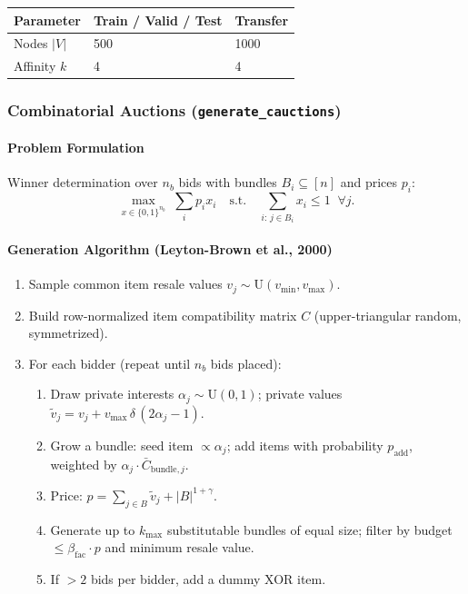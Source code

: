 \begin{tabular}{lll}
\toprule
Parameter & Train / Valid / Test & Transfer \\
\midrule
Nodes $|V|$  & 500 & 1000 \\
Affinity $k$ & 4   & 4    \\
\bottomrule
\end{tabular}

\subsubsection{Combinatorial Auctions (\texttt{generate\_cauctions})}

\paragraph{Problem Formulation}

Winner determination over $n_b$ bids with bundles $B_i \subseteq [n]$ and prices $p_i$:
\begin{equation}
    \max_{x \in \{0,1\}^{n_b}}\;\sum_i p_i x_i \quad\text{s.t.}\quad \sum_{i:\,j\in B_i} x_i \leq 1\;\;\forall j.
\end{equation}

\paragraph{Generation Algorithm (Leyton-Brown et al., 2000)}

\begin{enumerate}
    \item Sample common item resale values $v_j \sim \mathrm{U}(v_{\min}, v_{\max})$.
    \item Build row-normalized item compatibility matrix $C$ (upper-triangular random, symmetrized).
    \item For each bidder (repeat until $n_b$ bids placed):
    \begin{enumerate}
        \item Draw private interests $\alpha_j \sim \mathrm{U}(0,1)$; private values $\tilde{v}_j = v_j + v_{\max}\,\delta\,(2\alpha_j-1)$.
        \item Grow a bundle: seed item $\propto \alpha_j$; add items with probability $p_{\text{add}}$, weighted by $\alpha_j \cdot \bar{C}_{\text{bundle},j}$.
        \item Price: $p = \sum_{j \in B}\tilde{v}_j + |B|^{1+\gamma}$.
        \item Generate up to $k_{\max}$ substitutable bundles of equal size; filter by budget $\leq \beta_{\text{fac}} \cdot p$ and minimum resale value.
        \item If $>2$ bids per bidder, add a dummy XOR item.
    \end{enumerate}
\end{enumerate}

